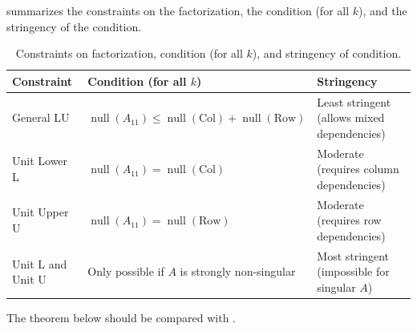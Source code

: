 \documentclass[10pt,twoside]{siamart1116}
\DeclareMathOperator{\nl}{null}
\numberwithin{theorem}{section}
\begin{document}
 summarizes the constraints on the factorization, the condition (for all $k$), and the stringency of the condition.

\begin{table}[htbp]
	\centering
	\begin{tabular}{lp{5cm}p{7cm}}
		\toprule
		Constraint & Condition (for all $k$) & Stringency \\
		\midrule
		General LU & \raggedright $\nl(A_{11}) \le \nl(\text{Col}) + \nl(\text{Row})$ & Least stringent (allows mixed dependencies) \\
		Unit Lower L & $\nl(A_{11}) = \nl(\text{Col})$ & Moderate (requires column dependencies) \\
		Unit Upper U & $\nl(A_{11}) = \nl(\text{Row})$ & Moderate (requires row dependencies) \\
		Unit L and Unit U & \raggedright Only possible if $A$ is strongly non-singular & Most stringent (impossible for singular $A$) \\
		\bottomrule
	\end{tabular}
	\vspace{5pt}
	\caption{Constraints on factorization, condition (for all $k$), and stringency of condition.}\label{tab:constraints}
\end{table}

The theorem below should be compared with .
\end{document}
